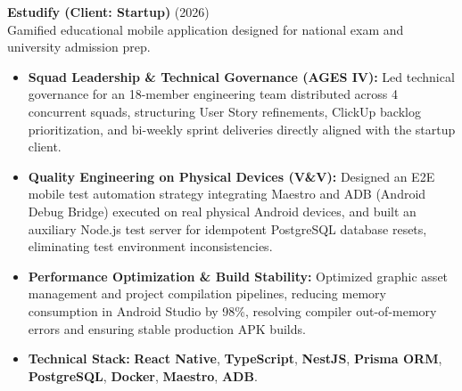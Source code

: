 \documentclass[10pt, letterpaper]{article}
\begin{document}
\textbf{Estudify (Client: Startup)} \hfill (2026) \\
Gamified educational mobile application designed for national exam and university admission prep.
\begin{itemize}
    \item \textbf{Squad Leadership \& Technical Governance (AGES IV):} Led technical governance for an 18-member engineering team distributed across 4 concurrent squads, structuring User Story refinements, ClickUp backlog prioritization, and bi-weekly sprint deliveries directly aligned with the startup client.

    \item \textbf{Quality Engineering on Physical Devices (V\&V):} Designed an E2E mobile test automation strategy integrating Maestro and ADB (Android Debug Bridge) executed on real physical Android devices, and built an auxiliary Node.js test server for idempotent PostgreSQL database resets, eliminating test environment inconsistencies.

    \item \textbf{Performance Optimization \& Build Stability:} Optimized graphic asset management and project compilation pipelines, reducing memory consumption in Android Studio by 98\%, resolving compiler out-of-memory errors and ensuring stable production APK builds.

    \item \textbf{Technical Stack:} \textbf{React Native}, \textbf{TypeScript}, \textbf{NestJS}, \textbf{Prisma ORM}, \textbf{PostgreSQL}, \textbf{Docker}, \textbf{Maestro}, \textbf{ADB}.
\end{itemize}
\end{document}

